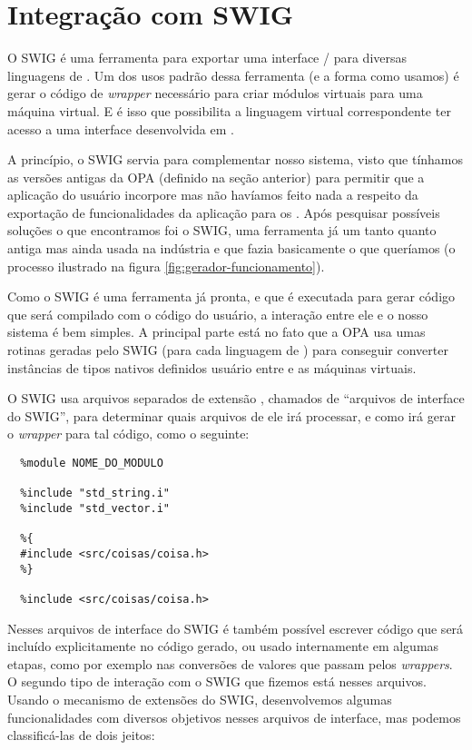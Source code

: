   \section{Integração com SWIG}
  \label{sec:actividads:integracaoswig}
  O SWIG é uma ferramenta para exportar uma interface \C{}/\CXX{} para diversas 
  linguagens de \script{}. Um dos usos padrão dessa ferramenta (e 
  a forma como usamos) é gerar o código de \textit{wrapper} necessário para criar 
  módulos virtuais para uma máquina virtual.
  E é isso que possibilita a linguagem virtual correspondente ter acesso a uma
  interface desenvolvida em \CXX{}.
  
  A princípio, o SWIG servia para complementar nosso sistema, visto que tínhamos
  as versões antigas da OPA (definido na seção anterior) para permitir que a aplicação
  do usuário incorpore  mas não havíamos feito nada a respeito da exportação
  de funcionalidades da aplicação para os . Após pesquisar possíveis soluções
  o que encontramos foi o SWIG, uma ferramenta já um tanto quanto antiga mas ainda usada
  na indústria e que fazia basicamente o que queríamos (o processo ilustrado na figura
  \ref{fig:gerador-funcionamento}).
  
  Como o SWIG é uma ferramenta já pronta, e que é executada para gerar código que será compilado
  com o código do usuário, a interação entre ele e o nosso sistema é bem simples. A principal
  parte está no fato que a OPA usa umas rotinas geradas pelo SWIG (para cada linguagem de
  \script{}) para conseguir converter instâncias de tipos nativos definidos usuário entre
  \CXX{} e as máquinas virtuais.
  
  O SWIG usa arquivos separados de extensão , chamados de ``arquivos de interface do 
  SWIG'', para determinar quais arquivos de \CXX{} ele irá processar, e como irá gerar o 
  \textit{wrapper} para tal código, como o seguinte:
  \vspace{1em}
  \begin{lstlisting}
  %module NOME_DO_MODULO

  %include "std_string.i"
  %include "std_vector.i"
  
  %{
  #include <src/coisas/coisa.h>
  %}

  %include <src/coisas/coisa.h>
  \end{lstlisting}
  \vspace{1em}
  
  Nesses arquivos de interface do SWIG é também possível escrever código que será incluído
  explicitamente no código gerado, ou usado internamente em algumas etapas, como por exemplo
  nas conversões de valores que passam pelos \textit{wrappers}. O segundo tipo de interação
  com o SWIG que fizemos está nesses arquivos. Usando o mecanismo de extensões do SWIG,
  desenvolvemos algumas funcionalidades com diversos objetivos nesses arquivos de interface,
  mas podemos classificá-las de dois jeitos:

